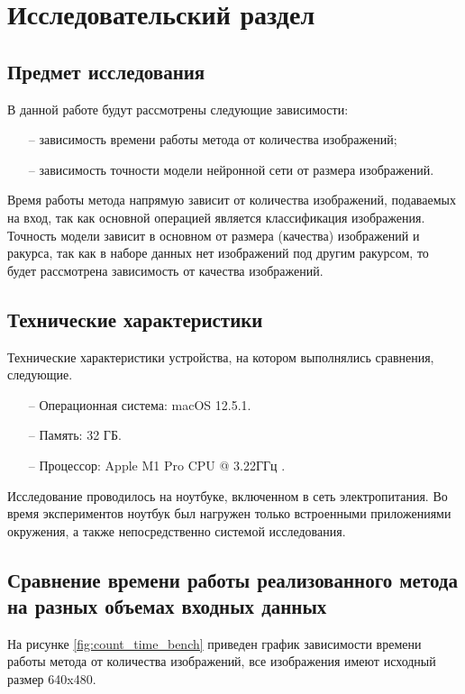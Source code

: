 \section{Исследовательский раздел}
\subsection{Предмет исследования}
В данной работе будут рассмотрены следующие зависимости:
\begin{itemize}[leftmargin=1.6\parindent]
	\item[--] зависимость времени работы метода от количества изображений;
	\item[--] зависимость точности модели нейронной сети от размера изображений.
\end{itemize}

Время работы метода напрямую зависит от количества изображений, подаваемых на вход, так как основной операцией является классификация изображения. Точность модели зависит в основном от размера (качества) изображений и ракурса, так как в наборе данных нет изображений под другим ракурсом, то будет рассмотрена зависимость от качества изображений.

\subsection*{Технические характеристики}
Технические характеристики устройства, на котором выполнялись сравнения, следующие.

\begin{itemize}
	\item[--] Операционная система: macOS 12.5.1.
	\item[--] Память: 32 ГБ.
	\item[--] Процессор: Apple M1 Pro CPU @ 3.22ГГц \cite{apple}.
\end{itemize}
Исследование проводилось на ноутбуке, включенном в сеть электропитания. Во время экспериментов ноутбук был нагружен только встроенными приложениями окружения, а также непосредственно системой исследования.

\subsection{Сравнение времени работы реализованного метода на разных объемах входных данных}
На рисунке \ref{fig:count_time_bench} приведен график зависимости времени работы метода от количества изображений, все изображения имеют исходный размер 640x480.

